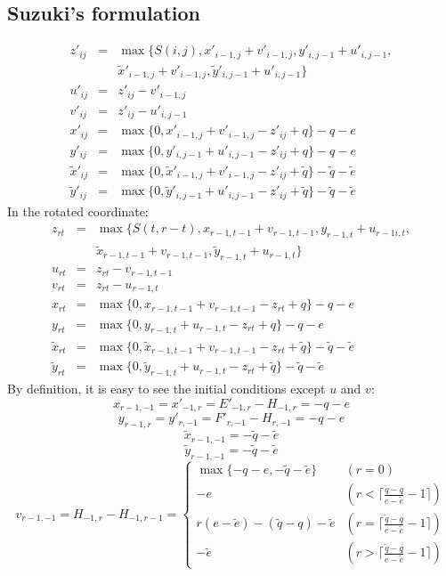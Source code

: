 \documentclass[10pt]{article}
\begin{document}
\subsection{Suzuki's formulation}

\begin{eqnarray*}
z'_{ij}&=&\max\{S(i,j),x'_{i-1,j}+v'_{i-1,j},y'_{i,j-1}+u'_{i,j-1},\\
&&\tilde{x}'_{i-1,j}+v'_{i-1,j},\tilde{y}'_{i,j-1}+u'_{i,j-1}\}\\
u'_{ij}&=&z'_{ij}-v'_{i-1,j}\\
v'_{ij}&=&z'_{ij}-u'_{i,j-1}\\
x'_{ij}&=&\max\{0,x'_{i-1,j}+v'_{i-1,j}-z'_{ij}+q\}-q-e\\
y'_{ij}&=&\max\{0,y'_{i,j-1}+u'_{i,j-1}-z'_{ij}+q\}-q-e\\
\tilde{x}'_{ij}&=&\max\{0,\tilde{x}'_{i-1,j}+v'_{i-1,j}-z'_{ij}+\tilde{q}\}-\tilde{q}-\tilde{e}\\
\tilde{y}'_{ij}&=&\max\{0,\tilde{y}'_{i,j-1}+u'_{i,j-1}-z'_{ij}+\tilde{q}\}-\tilde{q}-\tilde{e}
\end{eqnarray*}
In the rotated coordinate:
\begin{eqnarray*}
z_{rt}&=&\max\{S(t,r-t),x_{r-1,t-1}+v_{r-1,t-1},y_{r-1,t}+u_{r-1i,t},\\
&&\tilde{x}_{r-1,t-1}+v_{r-1,t-1},\tilde{y}_{r-1,t}+u_{r-1,t}\}\\
u_{rt}&=&z_{rt}-v_{r-1,t-1}\\
v_{rt}&=&z_{rt}-u_{r-1,t}\\
x_{rt}&=&\max\{0,x_{r-1,t-1}+v_{r-1,t-1}-z_{rt}+q\}-q-e\\
y_{rt}&=&\max\{0,y_{r-1,t}+u_{r-1,t}-z_{rt}+q\}-q-e\\
\tilde{x}_{rt}&=&\max\{0,\tilde{x}_{r-1,t-1}+v_{r-1,t-1}-z_{rt}+\tilde{q}\}-\tilde{q}-\tilde{e}\\
\tilde{y}_{rt}&=&\max\{0,\tilde{y}_{r-1,t}+u_{r-1,t}-z_{rt}+\tilde{q}\}-\tilde{q}-\tilde{e}
\end{eqnarray*}
By definition, it is easy to see the initial conditions except $u$ and $v$:
\[x_{r-1,-1}=x'_{-1,r}=E'_{-1,r}-H_{-1,r}=-q-e\]
\[y_{r-1,r}=y'_{r,-1}=F'_{r,-1}-H_{r,-1}=-q-e\]
\[\tilde{x}_{r-1,-1}=-\tilde{q}-\tilde{e}\]
\[\tilde{y}_{r-1,-1}=-\tilde{q}-\tilde{e}\]
\[v_{r-1,-1}=H_{-1,r}-H_{-1,r-1}=\left\{\begin{array}{ll}
\max\{-q-e,-\tilde{q}-\tilde{e}\} & (r=0)\\
-e & (r<\lceil\frac{\tilde{q}-q}{e-\tilde{e}}-1\rceil)\\
r(e-\tilde{e})-(\tilde{q}-q)-\tilde{e} & (r=\lceil\frac{\tilde{q}-q}{e-\tilde{e}}-1\rceil)\\
-\tilde{e} & (r>\lceil\frac{\tilde{q}-q}{e-\tilde{e}}-1\rceil)
\end{array}\right.\]
\end{document}
